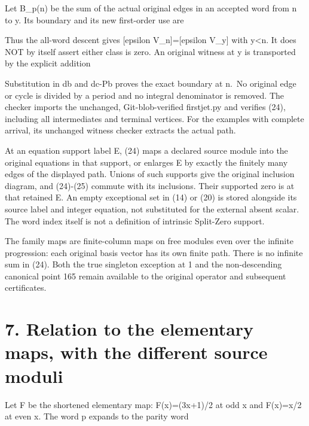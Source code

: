 Let B\_p(n) be the sum of the actual original edges in an accepted word
from n to y. Its boundary and its new first-order use are


Thus the all-word descent gives {[}epsilon V\_n{]}={[}epsilon V\_y{]}
with y\textless n. It does NOT by itself assert either class is zero. An
original witness at y is transported by the explicit addition


Substitution in db and dc-Pb proves the exact boundary at n.~No original
edge or cycle is divided by a period and no integral denominator is
removed. The checker imports the unchanged, Git-blob-verified
firstjet.py and verifies (24), including all intermediates and terminal
vertices. For the examples with complete arrival, its unchanged witness
checker extracts the actual path.

At an equation support label E, (24) maps a declared source module into
the original equations in that support, or enlarges E by exactly the
finitely many edges of the displayed path. Unions of such supports give
the original inclusion diagram, and (24)-(25) commute with its
inclusions. Their supported zero is at that retained E. An empty
exceptional set in (14) or (20) is stored alongside its source label and
integer equation, not substituted for the external absent scalar. The
word index itself is not a definition of intrinsic Split-Zero support.

The family maps are finite-column maps on free modules even over the
infinite progression: each original basis vector has its own finite
path. There is no infinite sum in (24). Both the true singleton
exception at 1 and the non-descending canonical point 165 remain
available to the original operator and subsequent certificates.

\section{7. Relation to the elementary maps, with the different source
moduli}

Let F be the shortened elementary map: F(x)=(3x+1)/2 at odd x and
F(x)=x/2 at even x. The word p expands to the parity word


